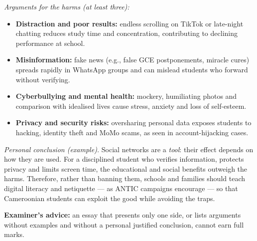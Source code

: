 \documentclass[11pt]{article}
\begin{document}
\begin{corrige}
\emph{Arguments for the harms (at least three):}
\begin{itemize}
    \item \textbf{Distraction and poor results:} endless scrolling on TikTok or late-night chatting reduces study time and concentration, contributing to declining performance at school.
    \item \textbf{Misinformation:} fake news (e.g., false GCE postponements, miracle cures) spreads rapidly in WhatsApp groups and can mislead students who forward without verifying.
    \item \textbf{Cyberbullying and mental health:} mockery, humiliating photos and comparison with idealised lives cause stress, anxiety and loss of self-esteem.
    \item \textbf{Privacy and security risks:} oversharing personal data exposes students to hacking, identity theft and MoMo scams, as seen in account-hijacking cases.
\end{itemize}

\emph{Personal conclusion (example).} Social networks are a \emph{tool}: their effect depends on how they are used. For a disciplined student who verifies information, protects privacy and limits screen time, the educational and social benefits outweigh the harms. Therefore, rather than banning them, schools and families should teach digital literacy and netiquette — as ANTIC campaigns encourage — so that Cameroonian students can exploit the good while avoiding the traps.

\textbf{Examiner's advice:} an essay that presents only one side, or lists arguments without examples and without a personal justified conclusion, cannot earn full marks.
\end{corrige}
\end{document}
